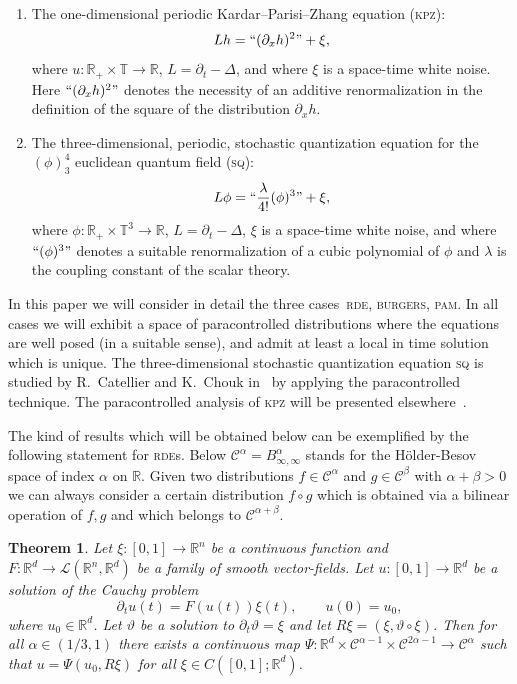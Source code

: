 \documentclass[a4paper,11pt]{article}
\newtheorem{theorem}{Theorem}[section]
\theoremstyle{remark}
\newcommand{\R}{\mathbb{R}}
\newcommand{\CC}{\ensuremath{\mathscr{C}}}
\newcommand{\reso}{\,\mathord{\circ}\,}
\begin{document}
\begin{enumerate}
  \item The one-dimensional periodic Kardar--Parisi--Zhang equation (\textsc{kpz}):
  \[
   L h = ``(\partial_x h)^2" + \xi,
  \]
    where $u \colon \R_+ \times \mathbb{T} \rightarrow \R$, $L = \partial_t - \Delta$, and where $\xi$ is a space-time white noise. Here $``(\partial_x h)^2"$ denotes the necessity of an additive renormalization in the definition of the square of the distribution $\partial_x h$.

  \item The three-dimensional, periodic,  stochastic quantization equation for the $(\phi)^4_3$ euclidean quantum field (\textsc{sq}):
  \[
   L \phi = ``\frac{\lambda}{4!} (\phi)^3" + \xi,
  \]
    where $\phi \colon \R_+ \times \mathbb{T}^3 \rightarrow \R$, $L = \partial_t - \Delta$, $\xi$ is a space-time white noise, and where $``(\phi)^3"$ denotes a suitable renormalization of a cubic polynomial of $\phi$ and $\lambda$ is the coupling constant of the scalar theory.
  
\end{enumerate}

In this paper we will consider in detail the three cases~\textsc{rde}, \textsc{burgers}, \textsc{pam}. In all cases we will exhibit a space of paracontrolled distributions where the equations are well posed (in a suitable sense), and admit at least a local in time solution which is unique.
%
The three-dimensional stochastic quantization equation \textsc{sq} is studied by R.~Catellier and K.~Chouk in~\cite{Catellier2013} by applying the paracontrolled technique. The paracontrolled analysis of \textsc{kpz}  will be presented elsewhere~\cite{Gubinelli-KPZ-2013}.


\bigskip

The kind of results which will be obtained below can be exemplified by the following statement for \textsc{rde}s. Below $\CC^\alpha = B^\alpha_{\infty, \infty}$ stands for the H\"older-Besov space of index $\alpha$ on $\mathbb{R}$. Given two distributions $f\in \CC^\alpha$ and $g\in \CC^\beta$ with $\alpha+\beta >0$ we can always consider a certain distribution $f \reso g$ which is obtained via a bilinear operation of $f,g$ and which belongs to $\CC^{\alpha+\beta}$.
\begin{theorem}
Let $\xi:[0,1]\to \mathbb{R}^n$ be a continuous function and $F:\mathbb{R}^d\to \mathcal{L}(\mathbb{R}^n, \mathbb{R}^d)$ be a family of  smooth vector-fields. Let $u:[0,1]\to \mathbb{R}^d$ be a 
 solution of the Cauchy problem
\[
\partial_t u(t) = F(u(t)) \xi(t),\qquad
u(0)=u_0,
\]
where $u_0 \in \R^d$. Let $\vartheta$ be a solution to $\partial_t \vartheta = \xi$ and let $R\xi=(\xi,\vartheta\reso \xi)$. Then for all $\alpha \in (1/3,1)$ there exists a continuous map $\Psi:\mathbb{R}^d\times\CC^{\alpha-1}\times\CC^{2\alpha-1}\to \CC^{\alpha}$ such that $u=\Psi(u_0,R\xi)$ for all $\xi\in C([0,1];\mathbb{R}^d)$.
\end{theorem}
\end{document}
